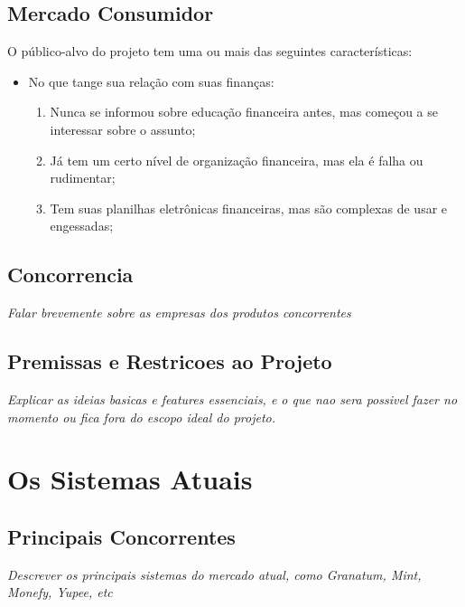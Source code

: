 \documentclass[a4paper]{abnt}
\begin{document}
\section{Mercado Consumidor}
O público-alvo do projeto tem uma ou mais das seguintes características:
\begin{itemize}
	\item No que tange sua relação com suas finanças:
	\begin{enumerate}
		\item Nunca se informou sobre educação financeira antes, mas começou a se interessar sobre o assunto;
		\item Já tem um certo nível de organização financeira, mas ela é falha ou rudimentar;
		\item Tem suas planilhas eletrônicas financeiras, mas são complexas de usar e engessadas;
	\end{enumerate}
\end{itemize}

\section{Concorrencia}
\emph{Falar brevemente sobre as empresas dos produtos concorrentes}

\section{Premissas e Restricoes ao Projeto}
\emph{Explicar as ideias basicas e features essenciais, e o que nao sera possivel fazer no momento ou fica fora do escopo ideal do projeto.}

\chapter{Os Sistemas Atuais}

\section{Principais Concorrentes}
\emph{Descrever os principais sistemas do mercado atual, como Granatum, Mint, Monefy, Yupee, etc}
\end{document}
